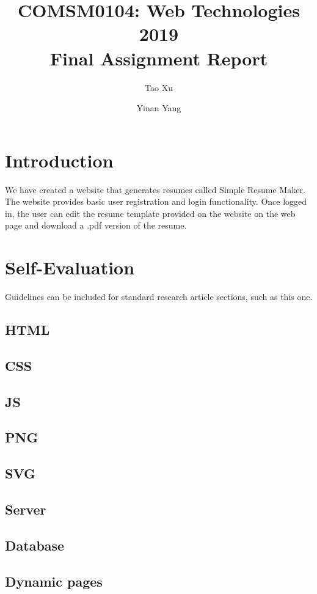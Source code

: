 \documentclass[fleqn,10pt]{olplainarticle}
\title{COMSM0104: Web Technologies 2019\\Final Assignment Report}
\author[1]{Tao Xu}
\author[2]{Yinan Yang}
\affil[1]{si19010@bristol.ac.uk}
\affil[2]{ff19085@bristol.ac.uk}
\begin{document}
	
	\flushbottom
	\maketitle
	\thispagestyle{empty}
	
	\section*{Introduction}
	
We have created a website that generates resumes called Simple Resume Maker. The website provides basic user registration and login functionality. Once logged in, the user can edit the resume template provided on the website on the web page and download a .pdf version of the resume.
	
	\section*{Self-Evaluation}
	
	Guidelines can be included for standard research article sections, such as this one.
	
	\subsection*{HTML}
	\subsection*{CSS}
	\subsection*{JS}
	\subsection*{PNG}
	\subsection*{SVG}
	\subsection*{Server}
	\subsection*{Database}
	\subsection*{Dynamic pages}
\end{document}
